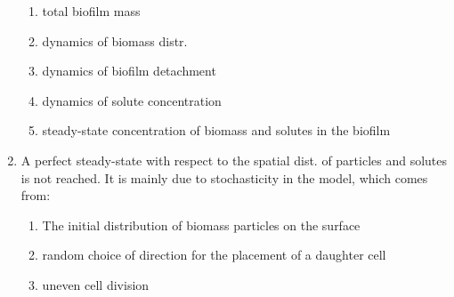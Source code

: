 \documentclass[10pt,a4paper]{article}
\begin{document}
\begin{enumerate}
\begin{enumerate}
  \item total biofilm mass
  \item dynamics of biomass distr.
  \item dynamics of biofilm detachment
  \item dynamics of solute concentration
  \item steady-state concentration of biomass and solutes in the biofilm
 \end{enumerate}
 \item A perfect steady-state with respect to the spatial dist. of particles and solutes is not reached.
 It is mainly due to stochasticity in the model, which comes from:
 \begin{enumerate}
  \item The initial distribution of biomass particles on the surface
  \item random choice of direction for the placement of a daughter cell
  \item uneven cell division
 \end{enumerate}
\end{enumerate}
\end{document}
